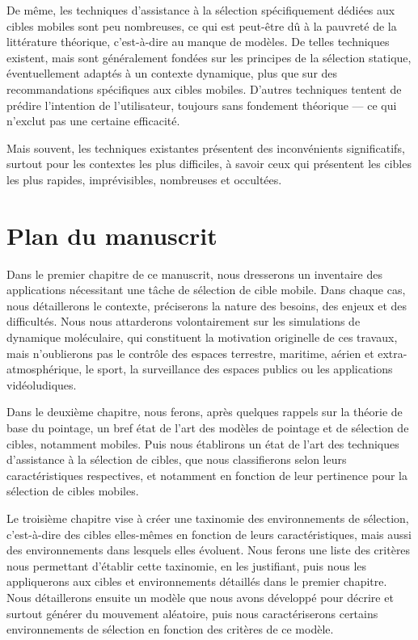 	De même, les techniques d'assistance à la sélection spécifiquement dédiées aux cibles mobiles sont peu nombreuses, ce qui est peut-être dû à la pauvreté de la littérature théorique, c'est-à-dire au manque de modèles. De telles techniques existent, mais sont généralement fondées sur les principes de la sélection statique, éventuellement adaptés à un contexte dynamique, plus que sur des recommandations spécifiques aux cibles mobiles. D'autres techniques tentent de prédire l'intention de l'utilisateur, toujours sans fondement théorique --- ce qui n'exclut pas une certaine efficacité.
	
	Mais souvent, les techniques existantes présentent des inconvénients significatifs, surtout pour les contextes les plus difficiles, à savoir ceux qui présentent les cibles les plus rapides, imprévisibles, nombreuses et occultées.

\section*{Plan du manuscrit}
	Dans le premier chapitre de ce manuscrit, nous dresserons un inventaire des applications nécessitant une tâche de sélection de cible mobile. Dans chaque cas, nous détaillerons le contexte, préciserons la nature des besoins, des enjeux et des difficultés. Nous nous attarderons volontairement sur les simulations de dynamique moléculaire, qui constituent la motivation originelle de ces travaux, mais n'oublierons pas le contrôle des espaces terrestre, maritime, aérien et extra-atmosphérique, le sport, la surveillance des espaces publics ou les applications vidéoludiques.
	
	Dans le deuxième chapitre, nous ferons, après quelques rappels sur la théorie de base du pointage, un bref état de l'art des modèles de pointage et de sélection de cibles, notamment mobiles. Puis nous établirons un état de l'art des techniques d'assistance à la sélection de cibles, que nous classifierons selon leurs caractéristiques respectives, et notamment en fonction de leur pertinence pour la sélection de cibles mobiles.
	
	Le troisième chapitre vise à créer une taxinomie des environnements de sélection, c'est-à-dire des cibles elles-mêmes en fonction de leurs caractéristiques, mais aussi des environnements dans lesquels elles évoluent. Nous ferons une liste des critères nous permettant d'établir cette taxinomie, en les justifiant, puis nous les appliquerons aux cibles et environnements détaillés dans le premier chapitre. Nous détaillerons ensuite un modèle que nous avons développé pour décrire et surtout générer du mouvement aléatoire, puis nous caractériserons certains environnements de sélection en fonction des critères de ce modèle.
	
